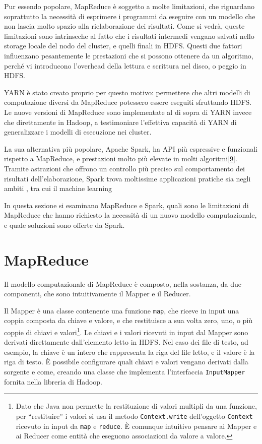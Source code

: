 \documentclass[italian,a4paper, twoside, 12pt]{report}
\begin{document}
Pur essendo popolare, MapReduce è soggetto a molte limitazioni, che
riguardano soprattutto la necessità di esprimere i programmi da eseguire
con un modello che non lascia molto spazio alla rielaborazione dei
risultati. Come si vedrà, queste limitazioni sono intrinseche al fatto
che i risultati intermedi vengano salvati nello storage locale del nodo
del cluster, e quelli finali in HDFS. Questi due fattori influenzano
pesantemente le prestazioni che si possono ottenere da un algoritmo,
perché vi introducono l'overhead della lettura e scrittura nel disco, o
peggio in HDFS.

YARN è stato creato proprio per questo motivo: permettere che altri
modelli di computazione diversi da MapReduce potessero essere eseguiti
sfruttando HDFS. Le nuove versioni di MapReduce sono implementate al di
sopra di YARN invece che direttamente in Hadoop, a testimoniare
l'effettiva capacità di YARN di generalizzare i modelli di esecuzione
nei cluster.

La sua alternativa più popolare, Apache Spark, ha API più espressive e
funzionali rispetto a MapReduce, e prestazioni molto più elevate in
molti
algoritmi{[}\protect\hyperlink{ref-mapreduce-spark-performance}{9}{]}.
Tramite astrazioni che offrono un controllo più preciso sul
comportamento dei risultati dell'elaborazione, Spark trova moltissime
applicazioni pratiche sia negli ambiti , tra cui il machine learning

In questa sezione si esaminano MapReduce e Spark, quali sono le
limitazioni di MapReduce che hanno richiesto la necessità di un nuovo
modello computazionale, e quale soluzioni sono offerte da Spark.

\section{MapReduce}\label{mapreduce}

Il modello computazionale di MapReduce è composto, nella sostanza, da
due componenti, che sono intuitivamente il Mapper e il Reducer.

Il Mapper è una classe contenente una funzione \texttt{map}, che riceve
in input una coppia composta da chiave e valore, e che restituisce a sua
volta zero, uno, o più coppie di chiavi e valori\footnote{Dato che Java
  non permette la restituzione di valori multipli da una funzione, per
  ``restituire'' i valori si usa il metodo \texttt{Context.write}
  dell'oggetto \texttt{Context} ricevuto in input da \texttt{map} e
  \texttt{reduce}. È comunque intuitivo pensare ai Mapper e ai Reducer
  come entità che eseguono associazioni da valore a valore.}. Le chiavi
e i valori ricevuti in input dal Mapper sono derivati direttamente
dall'elemento letto in HDFS. Nel caso dei file di testo, ad esempio, la
chiave è un intero che rappresenta la riga del file letto, e il valore è
la riga di testo. È possibile configurare quali chiavi e valori vengano
derivati dalla sorgente e come, creando una classe che implementa
l'interfaccia \texttt{InputMapper} fornita nella libreria di Hadoop.
\end{document}
